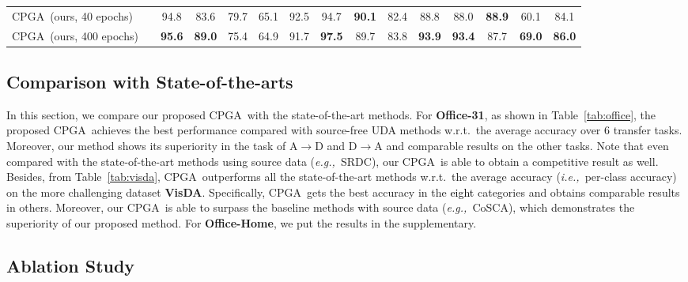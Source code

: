 \documentclass{article}
\def\ie{\emph{i.e.,~}}
\def\eg{\emph{e.g.,~}}
\def\wrt{w.r.t.~}
\def\mata{\textcolor{black}}
\def\ournet{CPGA}
\newcommand{\cmark}{\ding{51}}\newcommand{\xmark}{\ding{55}}\renewcommand{\algorithmicrequire}{\textbf{Require:}}
\begin{document}
\begin{table*}[!hbt]
\begin{center}
{\begin{tabular}{lcccccccccccccc}
        \midrule
        \ournet~(ours, 40 epochs) & \cmark & 94.8 & 83.6 & 79.7 & 65.1 & 92.5 & 94.7 & \textbf{90.1} & 82.4 & 88.8 & 88.0 & \textbf{88.9} & {60.1} & {84.1} \\
        \ournet~(ours, 400 epochs) & \cmark & \textbf{95.6} & \textbf{89.0} & 75.4 & 64.9 & 91.7 & \textbf{97.5} & 89.7 & 83.8 & \textbf{93.9} & \textbf{93.4} & 87.7 & \textbf{69.0} & \textbf{86.0} \\
\bottomrule
        \end{tabular}
    }
    \end{center}
    \vspace{-0.1in}
    \caption{\label{tab:visda}Classification accuracies (\%) on the large-scale \textbf{VisDA} dataset (ResNet-101).}
\end{table*}



\subsection{Comparison with State-of-the-arts}

In this section, we compare our proposed \ournet~with the state-of-the-art methods.
For \textbf{Office-31}, as shown in Table~\ref{tab:office}, the proposed \ournet~achieves the best performance compared with source-free UDA methods \wrt the average accuracy over 6 transfer tasks. Moreover, our method shows its superiority in the task of A$\rightarrow$D and D$\rightarrow$A and comparable results on the other tasks.
Note that even compared with the state-of-the-art methods using source data (\eg SRDC), our \ournet~is able to obtain a competitive result as well.
Besides, from Table~\ref{tab:visda}, \ournet~outperforms all the state-of-the-art methods \wrt the average accuracy (\ie per-class accuracy) on the more challenging dataset \textbf{VisDA}. Specifically, \ournet~gets the best accuracy in the \mata{eight} categories and obtains comparable results in others.
Moreover, our \ournet~is able to surpass the baseline methods with source data (\eg CoSCA), which demonstrates the superiority of our proposed method.
For \textbf{Office-Home}, we put the results in the supplementary.










\subsection{Ablation Study}
\end{document}
